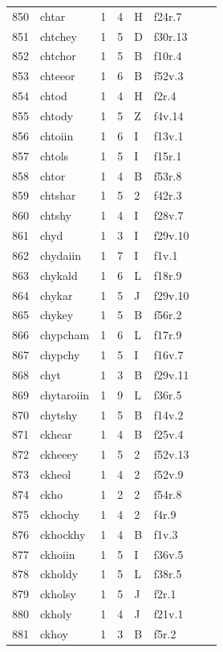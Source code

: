 \documentclass[11pt,a4paper]{article}
\begin{document}
\begin{landscape}
\begin{longtable}{@{}r>{\ttfamily}lrrl>{\ttfamily}l>{\raggedright\arraybackslash}p{80mm}>{\raggedright\arraybackslash}p{36mm}@{}}
850 & chtar & 1 & 4 & H & f24r.7 &  & \\
851 & chtchey & 1 & 5 & D & f30r.13 &  & \\
852 & chtchor & 1 & 5 & B & f10r.4 &  & \\
853 & chteeor & 1 & 6 & B & f52v.3 &  & \\
854 & chtod & 1 & 4 & H & f2r.4 &  & \\
855 & chtody & 1 & 5 & Z & f4v.14 &  & \\
856 & chtoiin & 1 & 6 & I & f13v.1 &  & \\
857 & chtols & 1 & 5 & I & f15r.1 &  & \\
858 & chtor & 1 & 4 & B & f53r.8 &  & \\
859 & chtshar & 1 & 5 & 2 & f42r.3 &  & \\
860 & chtshy & 1 & 4 & I & f28v.7 &  & \\
861 & chyd & 1 & 3 & I & f29v.10 &  & \\
862 & chydaiin & 1 & 7 & I & f1v.1 &  & \\
863 & chykald & 1 & 6 & L & f18r.9 &  & \\
864 & chykar & 1 & 5 & J & f29v.10 &  & \\
865 & chykey & 1 & 5 & B & f56r.2 &  & \\
866 & chypcham & 1 & 6 & L & f17r.9 &  & \\
867 & chypchy & 1 & 5 & I & f16v.7 &  & \\
868 & chyt & 1 & 3 & B & f29v.11 &  & \\
869 & chytaroiin & 1 & 9 & L & f36r.5 &  & \\
870 & chytshy & 1 & 5 & B & f14v.2 &  & \\
871 & ckhear & 1 & 4 & B & f25v.4 &  & \\
872 & ckheeey & 1 & 5 & 2 & f52v.13 &  & \\
873 & ckheol & 1 & 4 & 2 & f52v.9 &  & \\
874 & ckho & 1 & 2 & 2 & f54r.8 &  & \\
875 & ckhochy & 1 & 4 & 2 & f4r.9 &  & \\
876 & ckhockhy & 1 & 4 & B & f1v.3 &  & \\
877 & ckhoiin & 1 & 5 & I & f36v.5 &  & \\
878 & ckholdy & 1 & 5 & L & f38r.5 &  & \\
879 & ckholsy & 1 & 5 & J & f2r.1 &  & \\
880 & ckholy & 1 & 4 & J & f21v.1 &  & \\
881 & ckhoy & 1 & 3 & B & f5r.2 &  & \\

\end{longtable}
\end{landscape}
\end{document}
